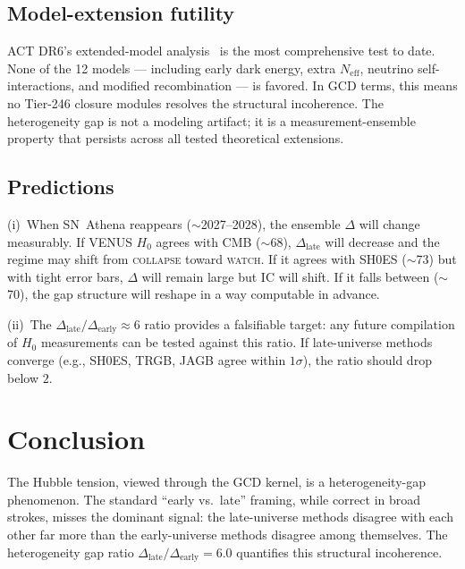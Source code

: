 \documentclass[
  aps,
  prd,
  twocolumn,
  superscriptaddress,
  nofootinbib,
  floatfix
]{revtex4-2}
\newcommand{\regime}[1]{\textrm{\upshape\scshape#1}}
\newcommand{\IC}{\mathrm{IC}}
\newcommand{\hetgap}{\Delta}
\begin{document}
\subsection{Model-extension futility}

ACT DR6's extended-model analysis~\cite{calabrese2025act_ext}
is the most comprehensive test to date.
None of the 12 models --- including early dark energy,
extra $N_{\mathrm{eff}}$, neutrino self-interactions,
and modified recombination --- is favored.
In GCD terms, this means no Tier-246 closure modules resolves the
structural incoherence.
The heterogeneity gap is not a modeling artifact;
it is a measurement-ensemble property that persists
across all tested theoretical extensions.

\subsection{Predictions}

(i)~When SN~Athena reappears ($\sim$2027--2028), the ensemble
$\hetgap$ will change measurably.
If VENUS $H_0$ agrees with CMB ($\sim$68),
$\hetgap_{\mathrm{late}}$ will decrease and the regime may
shift from \regime{collapse} toward \regime{watch}.
If it agrees with SH0ES ($\sim$73) but with tight error bars,
$\hetgap$ will remain large but $\IC$ will shift.
If it falls between ($\sim$70), the gap structure will
reshape in a way computable in advance.

(ii)~The $\hetgap_{\mathrm{late}}/\hetgap_{\mathrm{early}} \approx 6$
ratio provides a falsifiable target: any future compilation
of $H_0$ measurements can be tested against this ratio.
If late-universe methods converge (e.g., SH0ES, TRGB, JAGB agree
within $1\sigma$), the ratio should drop below $2$.

\section{Conclusion}\label{sec:conclusion}

The Hubble tension, viewed through the GCD kernel, is a
heterogeneity-gap phenomenon.
The standard ``early vs.\ late'' framing, while correct in broad
strokes, misses the dominant signal: the late-universe methods
disagree with each other far more than the early-universe methods
disagree among themselves.
The heterogeneity gap ratio
$\hetgap_{\mathrm{late}}/\hetgap_{\mathrm{early}} = 6.0$
quantifies this structural incoherence.
\end{document}
